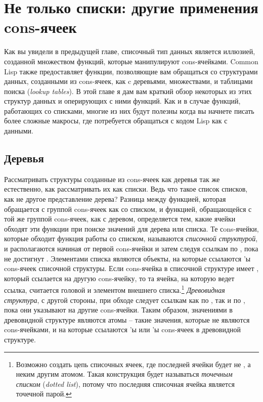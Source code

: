 \chapter{Не только списки: другие применения cons-ячеек}
\label{ch:13}

Как вы увидели в предыдущей главе, списочный тип данных является иллюзией, созданной
множеством функций, которые манипулируют cons-ячейками. Common Lisp также предоставляет
функции, позволяющие вам обращаться со структурами данных, созданными из cons-ячеек, как c
деревьями, множествами, и таблицами поиска (\textit{lookup tables}). В этой главе я дам
вам краткий обзор некоторых из этих структур данных и оперирующих с ними функций. Как и в
случае функций, работающих со списками, многие из них будут полезны когда вы начнете
писать более сложные макросы, где потребуется обращаться с кодом Lisp как с данными.


\section{Деревья}

Рассматривать структуры созданные из cons-ячеек как деревья так же естественно, как
рассматривать их как списки. Ведь что такое список списков, как не другое представление
дерева?  Разница между функцией, которая обращается с группой cons-ячеек как со списком, и
функцией, обращающейся с той же группой cons-ячеек, как с деревом, определяется тем, какие
ячейки обходят эти функции при поиске значений для дерева или списка. Те сons-ячейки,
которые обходит функция работы со списком, называются \textit{списочной структурой}, и
располагаются начиная от первой cons-ячейки и затем следуя ссылкам по , пока не
достигнут .  Элементами списка являются объекты, на которые ссылаются
'ы cons-ячеек списочной структуры. Если cons-ячейка в списочной структуре имеет
, который ссылается на другую cons-ячейку, то та ячейка, на которую ведет
ссылка, считается головой и элементом внешнего списка.\footnote{Возможно создать цепь
  списочных ячеек, где  последней ячейки будет не , а неким другим
  атомом. Такая конструкция будет называться \textit{точечным списком} (\textit{dotted
    list}), потому что последняя списочная ячейка является точечной парой.}
\textit{Древовидная структура}, с другой стороны, при обходе следует ссылкам как по
, так и по , пока они указывают на другие cons-ячейки. Таким образом,
значениями в древовидной структуре являются атомы -- такие значения, которые не являются
cons-ячейками, и на которые ссылаются 'ы или 'ы cons-ячеек в
древовидной структуре.

